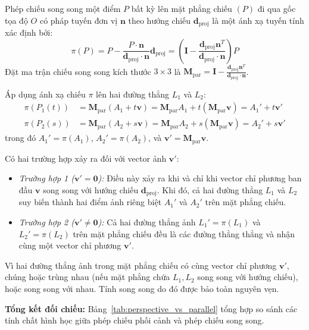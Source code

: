 Phép chiếu song song một điểm $P$ bất kỳ lên mặt phẳng chiếu $(P)$ đi qua gốc tọa độ $O$ có pháp tuyến đơn vị $\mathbf{n}$ theo hướng chiếu $\mathbf{d}_{\text{proj}}$ là một ánh xạ tuyến tính xác định bởi:
\begin{equation}
\label{eq:parallel_proj_affine_map}
\pi(P) = P - \frac{P \cdot \mathbf{n}}{\mathbf{d}_{\text{proj}} \cdot \mathbf{n}} \mathbf{d}_{\text{proj}} = \left( \mathbf{I} - \frac{\mathbf{d}_{\text{proj}} \mathbf{n}^T}{\mathbf{d}_{\text{proj}} \cdot \mathbf{n}} \right) P
\end{equation}
Đặt ma trận chiếu song song kích thước $3 \times 3$ là $\mathbf{M}_{\text{par}} = \mathbf{I} - \frac{\mathbf{d}_{\text{proj}} \mathbf{n}^T}{\mathbf{d}_{\text{proj}} \cdot \mathbf{n}}$.

Áp dụng ánh xạ chiếu $\pi$ lên hai đường thẳng $L_1$ và $L_2$:
\begin{align}
\pi(P_1(t)) &= \mathbf{M}_{\text{par}} (A_1 + t \mathbf{v}) = \mathbf{M}_{\text{par}} A_1 + t (\mathbf{M}_{\text{par}} \mathbf{v}) = A_1' + t \mathbf{v}' \\
\pi(P_2(s)) &= \mathbf{M}_{\text{par}} (A_2 + s \mathbf{v}) = \mathbf{M}_{\text{par}} A_2 + s (\mathbf{M}_{\text{par}} \mathbf{v}) = A_2' + s \mathbf{v}'
\end{align}
trong đó $A_1' = \pi(A_1)$, $A_2' = \pi(A_2)$, và $\mathbf{v}' = \mathbf{M}_{\text{par}} \mathbf{v}$.

Có hai trường hợp xảy ra đối với vector ảnh $\mathbf{v}'$:
\begin{itemize}
    \item \textit{Trường hợp 1 ($\mathbf{v}' = \mathbf{0}$):} Điều này xảy ra khi và chỉ khi vector chỉ phương ban đầu $\mathbf{v}$ song song với hướng chiếu $\mathbf{d}_{\text{proj}}$. Khi đó, cả hai đường thẳng $L_1$ và $L_2$ suy biến thành hai điểm ảnh riêng biệt $A_1'$ và $A_2'$ trên mặt phẳng chiếu.
    \item \textit{Trường hợp 2 ($\mathbf{v}' \neq \mathbf{0}$):} Cả hai đường thẳng ảnh $L_1' = \pi(L_1)$ và $L_2' = \pi(L_2)$ trên mặt phẳng chiếu đều là các đường thẳng thẳng và nhận cùng một vector chỉ phương $\mathbf{v}'$.
\end{itemize}
Vì hai đường thẳng ảnh trong mặt phẳng chiếu có cùng vector chỉ phương $\mathbf{v}'$, chúng hoặc trùng nhau (nếu mặt phẳng chứa $L_1, L_2$ song song với hướng chiếu), hoặc song song với nhau. Tính song song do đó được bảo toàn nguyên vẹn.

\textbf{Tổng kết đối chiếu:} Bảng~\ref{tab:perspective_vs_parallel} tổng hợp so sánh các tính chất hình học giữa phép chiếu phối cảnh và phép chiếu song song.

